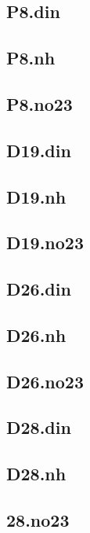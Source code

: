 \documentclass[12pt]{amsart}
\begin{document}
\subsection{P8.din}
\subsection{P8.nh}
\subsection{P8.no23}
\subsection{D19.din}
\subsection{D19.nh}
\subsection{D19.no23}
\subsection{D26.din}
\subsection{D26.nh}
\subsection{D26.no23}
\subsection{D28.din}
\subsection{D28.nh}
\subsection{28.no23}
\end{document}
